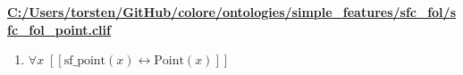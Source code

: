 \documentclass{article}
\begin{document}
\textbf{\url{C:/Users/torsten/GitHub/colore/ontologies/simple\_features/sfc\_fol/sfc\_fol\_point.clif}}

\begin{enumerate}
\item $\forall x\;  \left[ \left[ \textrm{sf\_point}(x) \leftrightarrow \textrm{Point}(x) \right] \right]$
\end{enumerate}
\end{document}
